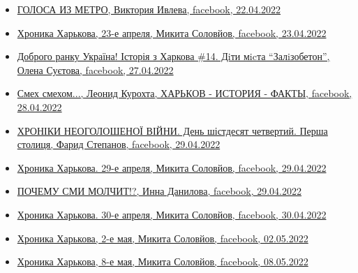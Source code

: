 \begin{itemize}
\item \hyperlink{22_04_2022.fb.ivleva_viktoria.moskva.ng.1.golosa_iz_metro}{%
ГОЛОСА ИЗ МЕТРО, Виктория Ивлева, facebook, 22.04.2022%
}

\item \hyperlink{23_04_2022.fb.solovjov_mikita.harkov.demsokyra.1.hronika}{%
Хроника Харькова, 23-е апреля, Микита Соловйов, facebook, 23.04.2022%
}

\item \hyperlink{27_04_2022.fb.suetova_olena.kiev.1.istoria_v_harkova_14}{%
Доброго ранку Україна! Історія з Харкова \#14. Дiти мicта \enquote{Залiзобетон}, %
Олена Суєтова, facebook, 27.04.2022%
}

\item \hyperlink{28_04_2022.fb.fb_group.harkov_istoria_fakty.1.smeh_smehom}{%
Смех смехом..., Леонид Курохта, ХАРЬКОВ - ИСТОРИЯ - ФАКТЫ, facebook, 28.04.2022%
}

\item \hyperlink{29_04_2022.fb.fb_group.story_kiev_ua.1.hronika_harkov}{%
ХРОНІКИ НЕОГОЛОШЕНОЇ ВІЙНИ. День шістдесят четвертий. Перша столиця, Фарид Степанов, facebook, 29.04.2022%
}

\item \hyperlink{29_04_2022.fb.solovjov_mikita.harkov.demsokyra.1.hronika}{%
Хроника Харькова. 29-е апреля, Микита Соловйов, facebook, 29.04.2022%
}

\item \hyperlink{29_04_2022.fb.danilova_inna.harkov.1.smi_molchit}{%
ПОЧЕМУ СМИ МОЛЧИТ!?, Инна Данилова, facebook, 29.04.2022%
}

\item \hyperlink{30_04_2022.fb.solovjov_mikita.harkov.demsokyra.1.hronika}{%
Хроника Харькова. 30-е апреля, Микита Соловйов, facebook, 30.04.2022%
}

\item \hyperlink{02_05_2022.fb.solovjov_mikita.harkov.demsokyra.1.hronika}{%
Хроника Харькова, 2-е мая, Микита Соловйов, facebook, 02.05.2022%
}


\item \hyperlink{08_05_2022.fb.solovjov_mikita.harkov.demsokyra.1.hronika}{%
Хроника Харькова, 8-е мая, Микита Соловйов, facebook, 08.05.2022%
}


\end{itemize}

